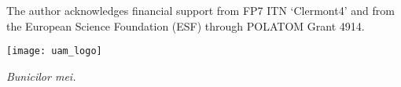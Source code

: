 
\noindent
The author acknowledges financial support from FP7 ITN `Clermont4' and
from the European Science Foundation (ESF) through POLATOM Grant 4914.
\vspace{\baselineskip}


\begin{center}
\texttt{[image: uam\_logo]}  
\end{center}


\newpage

\thispagestyle{empty}

\phantom{text}

\vspace{2cm}

\begin{flushright}
  {\em Bunicilor mei.}
\end{flushright}

\newpage

\thispagestyle{empty}

